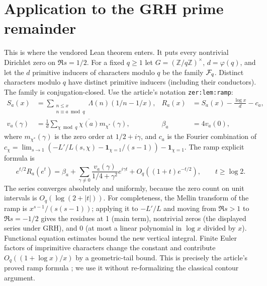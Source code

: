 \documentclass[11pt]{article}
\theoremstyle{definition}\newtheorem{definition}[theorem]{Definition}
\begin{document}
\section{Application to the GRH prime remainder}
This is where the vendored Lean theorem enters. It puts every nontrivial Dirichlet zero on $\Re s=1/2$. For a fixed $q\ge1$ let $G=(\mathbb Z/q\mathbb Z)^\times$, $d=\varphi(q)$, and let the $d$ primitive inducers of characters modulo $q$ be the family $\mathcal F_q$. Distinct characters modulo $q$ have distinct primitive inducers (including their conductors). The family is conjugation-closed. Use the article's notation \texttt{zer:lem:ramp}:
\begin{align*}
 S_a(x)&=\sum_{\substack{n\le x\\n\equiv a\bmod q}}\Lambda(n)(1/n-1/x),&
 R_a(x)&=S_a(x)-\frac{\log x}{d}-c_a,\\
 v_a(\gamma)&=\frac1d\sum_{\chi\bmod q}\overline{\chi(a)}m_{\chi^*}(\gamma),& \beta_a&=4v_a(0),
\end{align*}
where $m_{\chi^*}(\gamma)$ is the zero order at $1/2+i\gamma$, and $c_a$ is the Fourier combination of $c_\chi=\lim_{s\to1}(-L'/L(s,\chi)-\mathbf1_{\chi=1}/(s-1))-\mathbf1_{\chi=1}$. The ramp explicit formula is
\begin{equation}\label{eq:ramp}
 e^{t/2}R_a(e^t)=\beta_a+\sum_{\gamma\ne0}\frac{v_a(\gamma)}{1/4+\gamma^2}e^{i\gamma t}+O_q((1+t)e^{-t/2}),\qquad t\ge\log2.
\end{equation}
The series converges absolutely and uniformly, because the zero count on unit intervals is $O_q(\log(2+|t|))$. For completeness, the Mellin transform of the ramp is $x^{s-1}/(s(s-1))$; applying it to $-L'/L$ and moving from $\Re s>1$ to $\Re s=-1/2$ gives the residues at 1 (main term), nontrivial zeros (the displayed series under GRH), and 0 (at most a linear polynomial in $\log x$ divided by $x$). Functional equation estimates bound the new vertical integral. Finite Euler factors of imprimitive characters change the constant and contribute $O_q((1+\log x)/x)$ by a geometric-tail bound. This is precisely the article's proved ramp formula \cite{article}; we use it without re-formalizing the classical contour argument.
\end{document}
